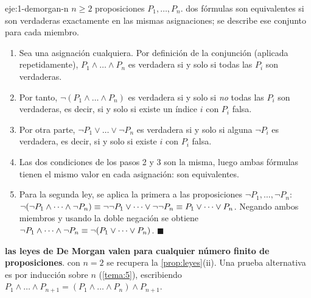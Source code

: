 \begin{solucion}{eje:1-demorgan-n}
\datos $n\ge 2$ proposiciones $P_1,\dots,P_n$.
\planteamiento dos fórmulas son equivalentes si son verdaderas exactamente en las mismas asignaciones; se describe ese conjunto para cada miembro.
\pasos
\begin{enumerate}[label=\arabic*.]
  \item Sea una asignación cualquiera. Por definición de la conjunción (aplicada repetidamente), $P_1\wedge\dots\wedge P_n$ es verdadera si y solo si todas las $P_i$ son verdaderas.
  \item Por tanto, $\neg(P_1\wedge\dots\wedge P_n)$ es verdadera si y solo si \emph{no} todas las $P_i$ son verdaderas, es decir, si y solo si existe un índice $i$ con $P_i$ falsa.
  \item Por otra parte, $\neg P_1\vee\dots\vee\neg P_n$ es verdadera si y solo si alguna $\neg P_i$ es verdadera, es decir, si y solo si existe $i$ con $P_i$ falsa.
  \item Las dos condiciones de los pasos 2 y 3 son la misma, luego ambas fórmulas tienen el mismo valor en cada asignación: son equivalentes.
  \item Para la segunda ley, se aplica la primera a las proposiciones $\neg P_1,\dots,\neg P_n$: $\neg(\neg P_1\wedge\dots\wedge\neg P_n)\equiv\neg\neg P_1\vee\dots\vee\neg\neg P_n\equiv P_1\vee\dots\vee P_n$. Negando ambos miembros y usando la doble negación se obtiene $\neg P_1\wedge\dots\wedge\neg P_n\equiv\neg(P_1\vee\dots\vee P_n)$. $\blacksquare$
\end{enumerate}
\resultado \textbf{las leyes de De Morgan valen para cualquier número finito de proposiciones}.
\comprobacion con $n=2$ se recupera la \cref{prop:leyes}(ii). Una prueba alternativa es por inducción sobre $n$ (\cref{tema:5}), escribiendo $P_1\wedge\dots\wedge P_{n+1}=(P_1\wedge\dots\wedge P_n)\wedge P_{n+1}$.
\end{solucion}

